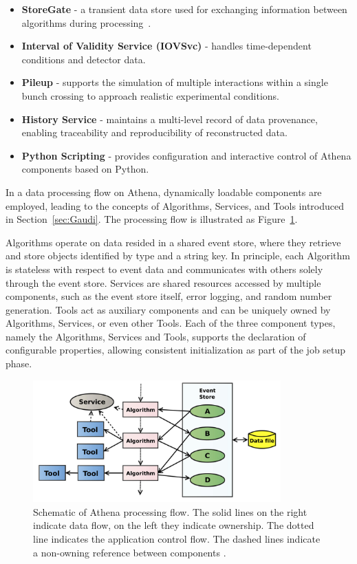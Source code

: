 \begin{itemize}
    \item \textbf{StoreGate} - a transient data store used for exchanging information between algorithms during processing~\cite{AthenaStoreGate}.
    \item \textbf{Interval of Validity Service (IOVSvc)} - handles time-dependent conditions and detector data.
    \item \textbf{Pileup} - supports the simulation of multiple interactions within a single bunch crossing to approach realistic experimental conditions.
    \item \textbf{History Service} - maintains a multi-level record of data provenance, enabling traceability and reproducibility of reconstructed data.
    \item \textbf{Python Scripting} - provides configuration and interactive control of Athena components based on Python.
\end{itemize}

In a data processing flow on Athena, dynamically loadable components are employed, leading to the concepts of Algorithms, Services, and Tools introduced in Section~\ref{sec:Gaudi}. The processing flow is illustrated as Figure~\ref{fig:Athena_process}. 

Algorithms operate on data resided in a shared event store, where they retrieve and store objects identified by type and a string key. In principle, each Algorithm is stateless with respect to event data and communicates with others solely through the event store. Services are shared resources accessed by multiple components, such as the event store itself, error logging, and random number generation. Tools act as auxiliary components and can be uniquely owned by Algorithms, Services, or even other Tools. Each of the three component types, namely the Algorithms, Services and Tools, supports the declaration of configurable properties, allowing consistent initialization as part of the job setup phase.

\begin{figure}[htbp]
  \centering
  \includegraphics[width=0.85\textwidth]{figs/chapter3/Athena_process.png}
  \caption{Schematic of Athena processing flow. The solid lines on the right indicate data flow, on the left they indicate ownership. The dotted line indicates the application control flow. The dashed lines indicate a non-owning reference between components \cite{ATLAScomputing2025}.}
  \label{fig:Athena_process}
\end{figure}


